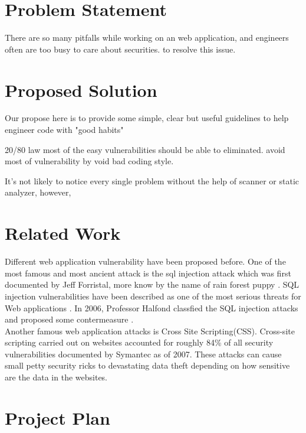 \documentclass[12pt, a4paper]{article}
\begin{document}
\section{Problem Statement}
There are so many pitfalls while working on an web application,
and engineers often are too busy to care about securities.
to resolve this issue.

\section{Proposed Solution}
Our propose here is to provide some simple, clear but useful guidelines
to help engineer code with "good habits"

20/80 law
most of the easy vulnerabilities should be able to eliminated.
avoid most of vulnerability by void bad coding style.

It's not likely to notice every single problem without the help of scanner or static analyzer,
however,


\section{Related Work}
Different web application vulnerability have been proposed before. One of the most famous and most ancient attack is the sql injection attack which was first documented by Jeff Forristal, more know by the name of rain
forest puppy \cite{Jeff}.  SQL injection vulnerabilities have been described as one of the most serious threats for Web applications \cite{Aucsmith} \cite{TO}. In 2006, Professor Halfond classfied the SQL injection attacks and proposed some contermeasure \cite{halfond06mar}.\\

Another famous web application attacks is Cross Site Scripting(CSS). Cross-site scripting carried out on websites accounted for roughly 84\% of all security vulnerabilities documented by Symantec as of 2007\cite{symantec}. These attacks can cause small petty security ricks to devastating data theft depending on how sensitive are the data in the websites.

\section{Project Plan}



\end{document}
